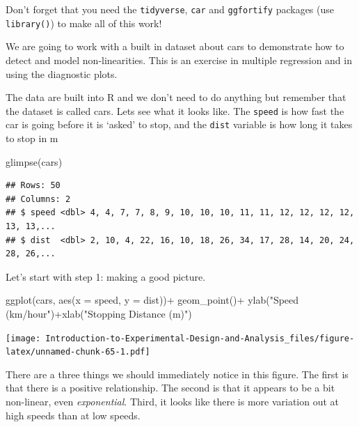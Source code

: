 \documentclass[
]{book}
\newenvironment{Shaded}{\begin{snugshade}}{\end{snugshade}}
\newcommand{\AttributeTok}[1]{\textcolor[rgb]{0.77,0.63,0.00}{#1}}
\newcommand{\FunctionTok}[1]{\textcolor[rgb]{0.00,0.00,0.00}{#1}}
\newcommand{\NormalTok}[1]{#1}
\newcommand{\SpecialCharTok}[1]{\textcolor[rgb]{0.00,0.00,0.00}{#1}}
\newcommand{\StringTok}[1]{\textcolor[rgb]{0.31,0.60,0.02}{#1}}
\begin{document}
Don't forget that you need the \texttt{tidyverse}, \texttt{car} and \texttt{ggfortify} packages (use \texttt{library()}) to make all of this work!

We are going to work with a built in dataset about cars to demonstrate how to detect and model non-linearities. This is an exercise in multiple regression and in using the diagnostic plots.

The data are built into R and we don't need to do anything but remember that the dataset is called cars. Lets see what it looks like. The \texttt{speed} is how fast the car is going before it is `asked' to stop, and the \texttt{dist} variable is how long it takes to stop in m

\begin{Shaded}
\begin{Highlighting}[]
\FunctionTok{glimpse}\NormalTok{(cars)}
\end{Highlighting}
\end{Shaded}

\begin{verbatim}
## Rows: 50
## Columns: 2
## $ speed <dbl> 4, 4, 7, 7, 8, 9, 10, 10, 10, 11, 11, 12, 12, 12, 12, 13, 13,...
## $ dist  <dbl> 2, 10, 4, 22, 16, 10, 18, 26, 34, 17, 28, 14, 20, 24, 28, 26,...
\end{verbatim}

Let's start with step 1: making a good picture.

\begin{Shaded}
\begin{Highlighting}[]
\FunctionTok{ggplot}\NormalTok{(cars, }\FunctionTok{aes}\NormalTok{(}\AttributeTok{x =}\NormalTok{ speed, }\AttributeTok{y =}\NormalTok{ dist))}\SpecialCharTok{+}
  \FunctionTok{geom\_point}\NormalTok{()}\SpecialCharTok{+}
  \FunctionTok{ylab}\NormalTok{(}\StringTok{"Speed (km/hour"}\NormalTok{)}\SpecialCharTok{+}\FunctionTok{xlab}\NormalTok{(}\StringTok{"Stopping Distance (m)"}\NormalTok{)}
\end{Highlighting}
\end{Shaded}

\texttt{[image: Introduction-to-Experimental-Design-and-Analysis\_files/figure-latex/unnamed-chunk-65-1.pdf]}

There are a three things we should immediately notice in this figure. The first is that there is a positive relationship. The second is that it appears to be a bit non-linear, even \emph{exponential}. Third, it looks like there is more variation out at high speeds than at low speeds.
\end{document}
